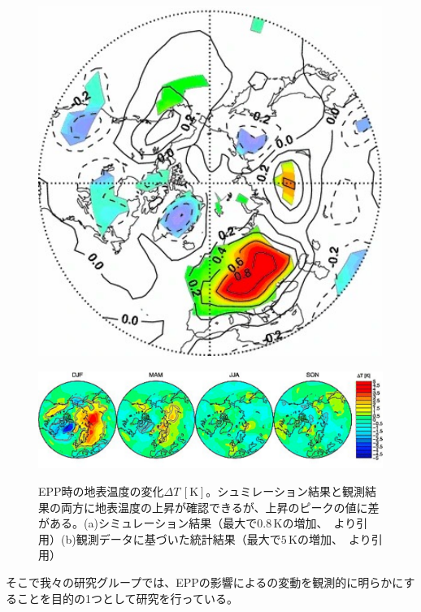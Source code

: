 \begin{figure}[htbp]
    \centering
    \begin{minipage}{\linewidth}
        \centering
        \includegraphics[scale=0.6]{master_thesis_contents/master_thesis_fig/rozanov2012_fig12.pdf}
        \label{fig:rozanov2012_fig12}
    \end{minipage}
    \begin{minipage}{\linewidth}
        \centering
        \includegraphics[scale=0.6]{master_thesis_contents/master_thesis_fig/seppala2009_fig3.pdf}
        \label{fig:seppala2009_fig3}
    \end{minipage}
    \caption{EPP時の地表温度の変化$\Delta T\, \mathrm{[K]}$。シュミレーション結果と観測結果の両方に地表温度の上昇が確認できるが、上昇のピークの値に差がある。(a)シミュレーション結果（最大で$0.8\, \mathrm{K}$の増加、~\cite{rozanov2012influence}より引用）(b)観測データに基づいた統計結果（最大で$5\, \mathrm{K}$の増加、~\cite{seppala2009geomagnetic}より引用）}
    \label{fig:rozanov2012_seppala2009}
\end{figure}
そこで我々の研究グループでは、EPPの影響によるの変動を観測的に明らかにすることを目的の1つとして研究を行っている。
